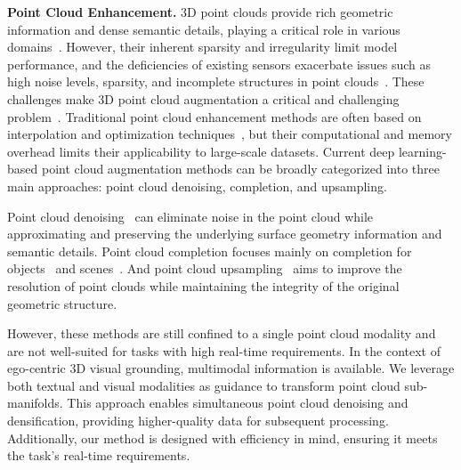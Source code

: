\noindent\textbf{Point Cloud Enhancement.}
3D point clouds provide rich geometric information and dense semantic details, playing a critical role in various domains~\cite{yang2022ransacs,xiang2023multi,wang2023embodiedscan,yu2021pointr}. However, their inherent sparsity and irregularity limit model performance, and the deficiencies of existing sensors exacerbate issues such as high noise levels, sparsity, and incomplete structures in point clouds~\cite{muzahid2020curvenet,zhu2019vision}. These challenges make 3D point cloud augmentation a critical and challenging problem~\cite{quan2024deep}. Traditional point cloud enhancement methods are often based on interpolation and optimization techniques~\cite{vizzo2022make}, but their computational and memory overhead limits their applicability to large-scale datasets. Current deep learning-based point cloud augmentation methods can be broadly categorized into three main approaches: point cloud denoising, completion, and upsampling.

Point cloud denoising~\cite{zhao2022noise,chen2022repcd,wang2023transformer,de2023iterativepfn,de2024straightpcf} can eliminate noise in the point cloud while approximating and preserving the underlying surface geometry information and semantic details. Point cloud completion focuses mainly on completion for objects~\cite{chen2024learning, leng2024point, yu2021pointr,zhang2024walkformer} and scenes~\cite{xia2023scpnet,xu2023casfusionnet,wang2024semantic,zhang2023point}. And point cloud upsampling~\cite{yu2018pu,liu2022pufa,kumbar2023tp,rong2024repkpu,du2022point} aims to improve the resolution of point clouds while maintaining the integrity of the original geometric structure. 


However, these methods are still confined to a single point cloud modality and are not well-suited for tasks with high real-time requirements. In the context of ego-centric 3D visual grounding, multimodal information is available. We leverage both textual and visual modalities as guidance to transform point cloud sub-manifolds. This approach enables simultaneous point cloud denoising and densification, providing higher-quality data for subsequent processing. Additionally, our method is designed with efficiency in mind, ensuring it meets the task's real-time requirements.


